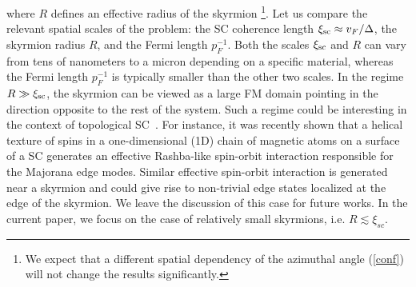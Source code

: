 \documentclass[twocolumn,showpacs,floatfix,longbibliography]{revtex4-1}
\begin{document}
where $R$ defines an effective radius of the skyrmion \footnote{We expect that a different spatial dependency of the azimuthal angle (\ref{conf}) will not change the results significantly.}. Let us compare the relevant spatial scales of the problem: the SC coherence length $\xi_{\rm sc} \approx v_F/\Delta$, the skyrmion radius $R$, and the Fermi length $p_F^{-1}$. Both the scales $\xi_{\rm sc}$ and $R$ can vary from tens of nanometers to a micron depending on a specific material, whereas the Fermi length $p_F^{-1}$ is typically smaller than the other two scales. In the regime $R\gg \xi_{\rm sc}$, the skyrmion can be viewed as a large FM domain pointing in the direction opposite to the rest of the system. Such a regime could be interesting in the context of topological SC~\cite{Alicea2012}. For instance, it was recently shown \cite{Braunecker2013,Klinovaja2013,Vazifeh2013} that a helical texture of spins in a one-dimensional (1D) chain of magnetic atoms on a surface of a SC generates an effective Rashba-like spin-orbit interaction responsible for the Majorana edge modes. Similar effective spin-orbit interaction is generated near a skyrmion and could give rise to non-trivial edge states localized at the edge of the skyrmion. We leave the discussion of this  case for future works. In the current paper, we focus on the case of relatively small skyrmions, i.e. $R\lesssim \xi_{sc}$.
\end{document}
